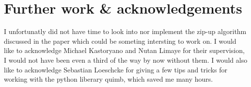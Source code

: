 \section{Further work \& acknowledgements}
I unfortunatly did not have time to look into nor implement the zip-up algorithm discussed in the paper which could be someting intersting to work on. 
I would like to acknowledge Michael Kastoryano and Nutan Limaye for their supervision, I would not have been even a third of the way by now without them. I would also like to acknowledge Sebastian Loeschcke for giving a few tips and tricks for working with the python liberary quimb, which saved me many hours.  
